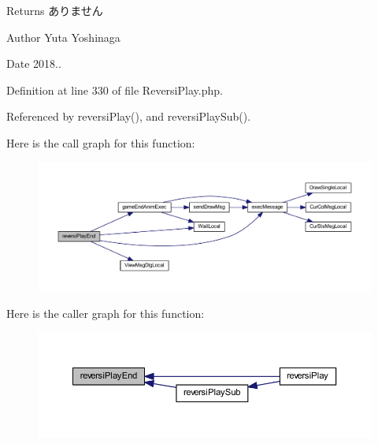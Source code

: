 \begin{DoxyReturn}{Returns}
ありません 
\end{DoxyReturn}
\begin{DoxyAuthor}{Author}
Yuta Yoshinaga 
\end{DoxyAuthor}
\begin{DoxyDate}{Date}
2018.. 
\end{DoxyDate}


Definition at line 330 of file Reversi\+Play.\+php.



Referenced by reversi\+Play(), and reversi\+Play\+Sub().

Here is the call graph for this function\+:\nopagebreak
\begin{figure}[H]
\begin{center}
\leavevmode
\includegraphics[width=350pt]{class_reversi_play_af55fe6b6f2005c7da80c696ed692783d_cgraph}
\end{center}
\end{figure}
Here is the caller graph for this function\+:\nopagebreak
\begin{figure}[H]
\begin{center}
\leavevmode
\includegraphics[width=350pt]{class_reversi_play_af55fe6b6f2005c7da80c696ed692783d_icgraph}
\end{center}
\end{figure}
\mbox{\label{class_reversi_play_a67816fe65a87e35d8e8cc35d5d269bcb}} 
